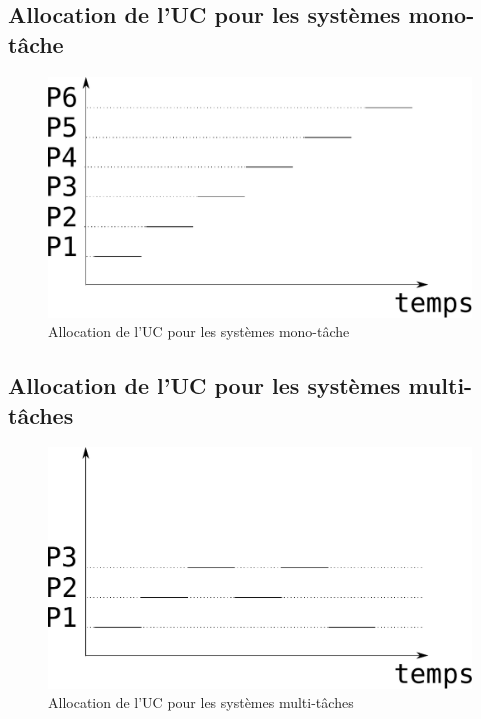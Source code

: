 \begin{frame}{\sectitle}
\def\subsectitle{Allocation de l'UC pour les systèmes mono-tâche}
\subsection{\subsectitle}
\begin{figure}
\begin{center}
\includegraphics[width=\textwidth]{images/monoTache.pdf}
\end{center}
\caption{\subsectitle}
\end{figure}
\end{frame}

\begin{frame}{\sectitle}
\def\subsectitle{Allocation de l'UC pour les systèmes multi-tâches}
\subsection{\subsectitle}
\begin{figure}
\begin{center}
\includegraphics[width=\textwidth]{images/multiTaches.pdf}
\end{center}
\caption{\subsectitle}
\end{figure}

\end{frame}


